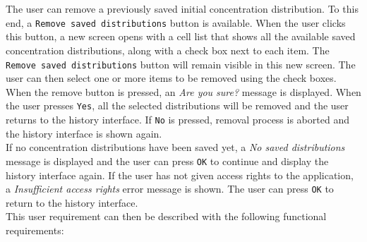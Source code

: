  \\
 \\
The user can remove a previously saved initial concentration distribution. To this end, a \texttt{Remove saved distributions} button is available. When the user clicks this button, a new screen opens with a cell list that shows all the available saved concentration distributions, along with a check box next to each item. The \texttt{Remove saved distributions} button will remain visible in this new screen. The user can then select one or more items to be removed using the check boxes. When the remove button is pressed, an \emph{Are you sure?} message is displayed. When the user presses \texttt{Yes}, all the selected distributions will be removed and the user returns to the history interface. If \texttt{No} is pressed, removal process is aborted and the history interface is shown again. \\ 
If no concentration distributions have been saved yet, a \emph{No saved distributions} message is displayed and the user can press \texttt{OK} to continue and display the history interface again. If the user has not given access rights to the application, a \emph{Insufficient access rights} error message is shown. The user can press \texttt{OK} to return to the history interface. \\
This user requirement can then be described with the following functional requirements:

